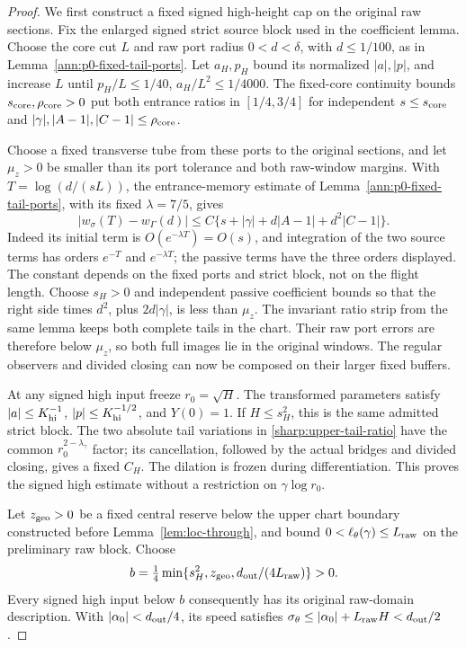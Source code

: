 \begin{proof}
We first construct a fixed signed high-height cap on the original raw
sections. Fix the enlarged signed strict source block used in the
coefficient lemma. Choose the core cut \(L\) and raw port radius
\(0<d<\delta\), with \(d\le1/100\), as in
Lemma~\ref{ann:p0-fixed-tail-ports}. Let \(a_H,p_H\) bound its
normalized \(|a|,|p|\), and increase \(L\) until
\(p_H/L\le1/40\), \(a_H/L^2\le1/4000\).
The fixed-core continuity bounds \(s_{\rm core},\rho_{\rm core}>0\)
put both entrance ratios in \([1/4,3/4]\) for independent
\(s\le s_{\rm core}\) and
\(|\gamma|,|A-1|,|C-1|\le\rho_{\rm core}\).

Choose a fixed transverse tube from these ports to the original
sections, and let \(\mu_z>0\) be smaller than its port tolerance and
both raw-window margins. With \(T=\log(d/(sL))\), the entrance-memory
estimate of Lemma~\ref{ann:p0-fixed-tail-ports}, with its fixed
\(\lambda=7/5\), gives
\begin{equation}\label{eq:raw-high-entrance-memory}
 |w_\sigma(T)-w_\Gamma(d)|
 \le C\{s+|\gamma|+d|A-1|+d^2|C-1|\}.
\end{equation}
Indeed its initial term is \(O(e^{-\lambda T})=O(s)\), and
integration of the two source terms has orders \(e^{-T}\) and
\(e^{-\lambda T}\); the passive terms have the three orders displayed.
The constant depends on the fixed ports and strict block, not on the
flight length. Choose \(s_H>0\) and independent passive coefficient
bounds so that the right side times \(d^2\), plus \(2d|\gamma|\),
is less than \(\mu_z\). The invariant ratio strip from the same lemma
keeps both complete tails in the chart. Their raw port errors are
therefore below \(\mu_z\), so both full images lie in the original
windows. The regular observers and divided closing can now be
composed on their larger fixed buffers.

At any signed high input freeze \(r_0=\sqrt H\). The transformed
parameters satisfy \(|a|\le K_{\rm hi}^{-1}\),
\(|p|\le K_{\rm hi}^{-1/2}\), and \(Y(0)=1\).
If \(H\le s_H^2\), this is the same admitted strict block.
The two absolute tail variations in
\eqref{sharp:upper-tail-ratio} have the common
\(r_0^{2-\lambda_\gamma}\) factor; its cancellation, followed by
the actual bridges and divided closing, gives a fixed \(C_H\).
The dilation is frozen during differentiation. This proves the signed
high estimate without a restriction on \(\gamma\log r_0\).

Let \(z_{\rm geo}>0\) be a fixed central reserve below the upper
chart boundary constructed before Lemma~\ref{lem:loc-through}, and
bound \(0<\ell_\theta(\gamma)\le L_{\rm raw}\) on the preliminary
raw block. Choose
\begin{equation}\label{eq:regional-fixed-raw-cap}
b=\tfrac14\min\{s_H^2,z_{\rm geo},d_{\rm out}/(4L_{\rm raw})\}>0.
\end{equation}
Every signed high input below \(b\) consequently has its original
raw-domain description. With \(|\alpha_0|<d_{\rm out}/4\), its
speed satisfies
\(\sigma_\theta\le|\alpha_0|+L_{\rm raw}H<d_{\rm out}/2\).


\end{proof}
